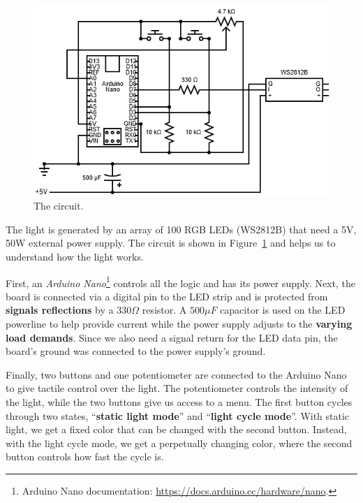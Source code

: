 \documentclass[preprint]{elsarticle}
\begin{document}
\begin{figure}[H]
	\centering
	\includegraphics[scale=0.55, keepaspectratio]{img/project_img/circuit-light.png}
	\caption{The circuit.}
	\label{fig:light-circuit}
\end{figure}





The light is generated by an array of 100 RGB LEDs (WS2812B) that need a 5V, 50W external power supply. 
The circuit is shown in Figure~\ref{fig:light-circuit} and helps us to understand how the light works. 

First, an \emph{Arduino Nano}\footnote{Arduino Nano documentation: \url{https://docs.arduino.cc/hardware/nano}.} controls all the logic and has its power supply.  Next, the board is connected via a digital pin to the LED strip and is protected  from \textbf{signals reflections} by a $330\Omega$ resistor. A $500 \mu F$ capacitor is used on the LED powerline to help provide current 
while the power supply adjusts to the \textbf{varying load demands}. Since we also need a signal return for the LED data pin, the board's ground was  connected to the power supply's ground. 

Finally, two buttons and one potentiometer are connected to the Arduino Nano to give tactile control over the light.  The potentiometer controls the intensity of the light, while the two buttons give us access to a menu. The first button cycles through two states, ``\textbf{static light mode}'' and ``\textbf{light cycle mode}''.  With static light, we get a fixed color that can be changed with the second button. Instead, with the light cycle mode, we get a perpetually changing color, where the second button controls how fast the cycle is.
\end{document}
